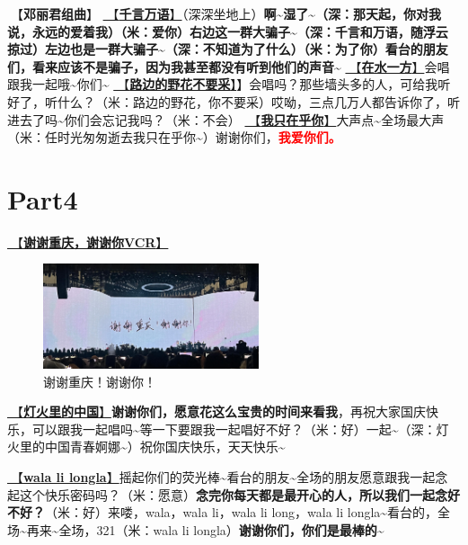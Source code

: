 \documentclass[]{ctexbook}
\begin{document}
🎵【\textbf{邓丽君组曲}】
\hyperref[thousands-of-words]{🎵【\textbf{千言万语}】}（深深坐地上）\textbf{啊\textasciitilde 湿了\textasciitilde（深：那天起，你对我说，永远的爱着我）（米：爱你）右边这一群大骗子\textasciitilde（深：千言和万语，随浮云掠过）左边也是一群大骗子\textasciitilde（深：不知道为了什么）（米：为了你）看台的朋友们，看来应该不是骗子，因为我甚至都没有听到他们的声音\textasciitilde{}}
\hyperref[on-the-water-side]{🎵【\textbf{在水一方}】}会唱跟我一起哦\textasciitilde 你们\textasciitilde{}
\hyperref[only-with-me]{🎵【\textbf{路边的野花不要采}】}】会唱吗？那些墙头多的人，可给我听好了，听什么？（米：路边的野花，你不要采）哎呦，三点几万人都告诉你了，听进去了吗\textasciitilde 你们会忘记我吗？（米：不会）
\hyperref[only-you]{🎵【\textbf{我只在乎你}】}大声点\textasciitilde 全场最大声（米：任时光匆匆逝去我只在乎你\textasciitilde）谢谢你们，\textbf{\textcolor{red}{我爱你们。} }

\section{Part4}\label{chongqing-20241007-part4}

\hyperref[thank-you-vcr]{🎥【\textbf{谢谢重庆，谢谢你VCR}】}

\begin{figure}

{\centering \includegraphics[width=180pt]{img/chongqing20241007/thank-chongqing} 

}

\caption{谢谢重庆！谢谢你！}\label{fig:unnamed-chunk-100}
\end{figure}

\hyperref[China-in-the-light]{🎵【\textbf{灯火里的中国}】}\textbf{谢谢你们，愿意花这么宝贵的时间来看我}，再祝大家国庆快乐，可以跟我一起唱吗\textasciitilde 等一下要跟我一起唱好不好？（米：好）一起\textasciitilde（深：灯火里的中国青春婀娜\textasciitilde）祝你国庆快乐，天天快乐\textasciitilde{}

\hyperref[wala-li-longla]{🎵【\textbf{wala li longla}】}摇起你们的荧光棒\textasciitilde 看台的朋友\textasciitilde 全场的朋友愿意跟我一起念起这个快乐密码吗？（米：愿意）\textbf{念完你每天都是最开心的人，所以我们一起念好不好？}（米：好）来喽，wala，wala li，wala li long，wala li longla\textasciitilde 看台的，全场\textasciitilde 再来\textasciitilde 全场，321（米：wala li longla）\textbf{谢谢你们，你们是最棒的\textasciitilde{}}
\end{document}
